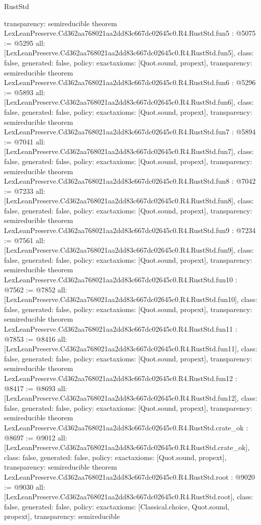 \begin{lexlean}{RustStd}
\begin{coremodule}
{  transparency: semireducible
}
theorem LexLeanPreserve.Cd362aa768021aa2dd83c667dc02645c0.R4.RustStd.fun5 : @5075 := @5295 {
  all: [LexLeanPreserve.Cd362aa768021aa2dd83c667dc02645c0.R4.RustStd.fun5],
  class: false,
  generated: false,
  policy: exact{axioms: [Quot.sound, propext]},
  transparency: semireducible
}
theorem LexLeanPreserve.Cd362aa768021aa2dd83c667dc02645c0.R4.RustStd.fun6 : @5296 := @5893 {
  all: [LexLeanPreserve.Cd362aa768021aa2dd83c667dc02645c0.R4.RustStd.fun6],
  class: false,
  generated: false,
  policy: exact{axioms: [Quot.sound, propext]},
  transparency: semireducible
}
theorem LexLeanPreserve.Cd362aa768021aa2dd83c667dc02645c0.R4.RustStd.fun7 : @5894 := @7041 {
  all: [LexLeanPreserve.Cd362aa768021aa2dd83c667dc02645c0.R4.RustStd.fun7],
  class: false,
  generated: false,
  policy: exact{axioms: [Quot.sound, propext]},
  transparency: semireducible
}
theorem LexLeanPreserve.Cd362aa768021aa2dd83c667dc02645c0.R4.RustStd.fun8 : @7042 := @7233 {
  all: [LexLeanPreserve.Cd362aa768021aa2dd83c667dc02645c0.R4.RustStd.fun8],
  class: false,
  generated: false,
  policy: exact{axioms: [Quot.sound, propext]},
  transparency: semireducible
}
theorem LexLeanPreserve.Cd362aa768021aa2dd83c667dc02645c0.R4.RustStd.fun9 : @7234 := @7561 {
  all: [LexLeanPreserve.Cd362aa768021aa2dd83c667dc02645c0.R4.RustStd.fun9],
  class: false,
  generated: false,
  policy: exact{axioms: [Quot.sound, propext]},
  transparency: semireducible
}
theorem LexLeanPreserve.Cd362aa768021aa2dd83c667dc02645c0.R4.RustStd.fun10 : @7562 := @7852 {
  all: [LexLeanPreserve.Cd362aa768021aa2dd83c667dc02645c0.R4.RustStd.fun10],
  class: false,
  generated: false,
  policy: exact{axioms: [Quot.sound, propext]},
  transparency: semireducible
}
theorem LexLeanPreserve.Cd362aa768021aa2dd83c667dc02645c0.R4.RustStd.fun11 : @7853 := @8416 {
  all: [LexLeanPreserve.Cd362aa768021aa2dd83c667dc02645c0.R4.RustStd.fun11],
  class: false,
  generated: false,
  policy: exact{axioms: [Quot.sound, propext]},
  transparency: semireducible
}
theorem LexLeanPreserve.Cd362aa768021aa2dd83c667dc02645c0.R4.RustStd.fun12 : @8417 := @8693 {
  all: [LexLeanPreserve.Cd362aa768021aa2dd83c667dc02645c0.R4.RustStd.fun12],
  class: false,
  generated: false,
  policy: exact{axioms: [Quot.sound, propext]},
  transparency: semireducible
}
theorem LexLeanPreserve.Cd362aa768021aa2dd83c667dc02645c0.R4.RustStd.crate_ok : @8697 := @9012 {
  all: [LexLeanPreserve.Cd362aa768021aa2dd83c667dc02645c0.R4.RustStd.crate_ok],
  class: false,
  generated: false,
  policy: exact{axioms: [Quot.sound, propext]},
  transparency: semireducible
}
theorem LexLeanPreserve.Cd362aa768021aa2dd83c667dc02645c0.R4.RustStd.root : @9020 := @9030 {
  all: [LexLeanPreserve.Cd362aa768021aa2dd83c667dc02645c0.R4.RustStd.root],
  class: false,
  generated: false,
  policy: exact{axioms: [Classical.choice, Quot.sound, propext]},
  transparency: semireducible
}


\end{coremodule}
\end{lexlean}
